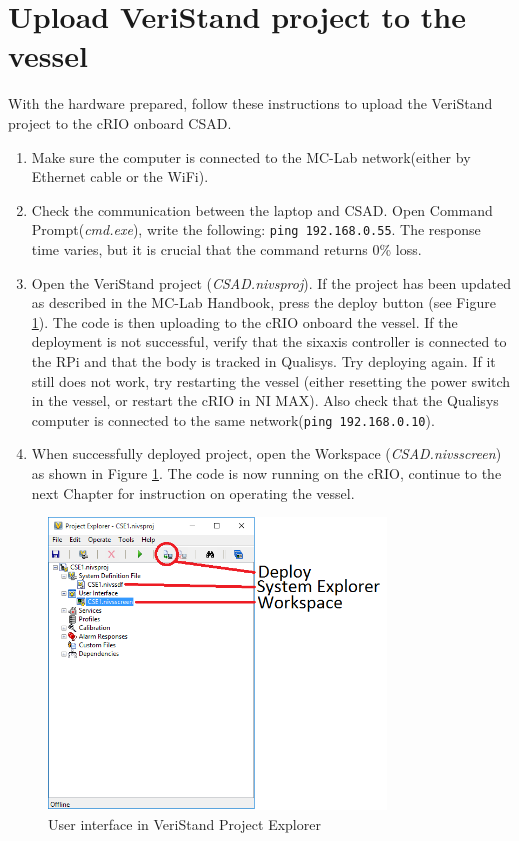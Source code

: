 \section{Upload VeriStand project to the vessel}
With the hardware prepared, follow these instructions to upload the VeriStand project to the cRIO onboard CSAD. 
\begin{enumerate}
	\item Make sure the computer is connected to the MC-Lab network(either by Ethernet cable or the WiFi). 
	\item Check the communication between the laptop and CSAD. Open Command Prompt(\textit{cmd.exe}), write the following: \texttt{ping 192.168.0.55}. The response time varies, but it is crucial that the command returns 0\% loss. 
	\item Open the VeriStand project (\textit{CSAD.nivsproj}). If the project has been updated as described in the MC-Lab Handbook, press the deploy button (see Figure \ref{fig:project_explorer}). The code is then uploading to the cRIO onboard the vessel. If the deployment is not successful, verify that the sixaxis controller is connected to the RPi and that the body is tracked in Qualisys. Try deploying again. If it still does not work, try restarting the vessel (either resetting the power switch in the vessel, or restart the cRIO in NI MAX). Also check that the Qualisys computer is connected to the same network(\texttt{ping 192.168.0.10}). 
	\item When successfully deployed project, open the Workspace (\textit{CSAD.nivsscreen}) as shown in Figure \ref{fig:project_explorer}. The code is now running on the cRIO, continue to the next Chapter for instruction on operating the vessel. 
\end{enumerate}
\begin{figure}[h!]
	\centering
	\includegraphics[width=0.8\textwidth]{fig/project_explorer.png}
	\caption{User interface in VeriStand Project Explorer}
	\label{fig:project_explorer}
\end{figure}

